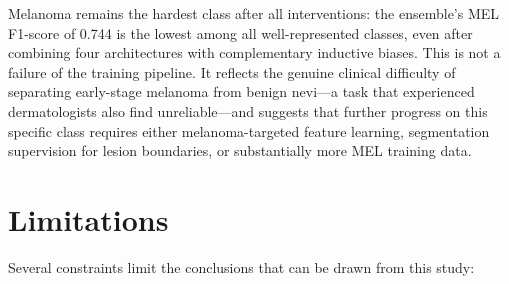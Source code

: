 Melanoma remains the hardest class after all interventions: the ensemble's MEL F1-score of 0.744 is the lowest among all well-represented classes, even after combining four architectures with complementary inductive biases. This is not a failure of the training pipeline. It reflects the genuine clinical difficulty of separating early-stage melanoma from benign nevi---a task that experienced dermatologists also find unreliable---and suggests that further progress on this specific class requires either melanoma-targeted feature learning, segmentation supervision for lesion boundaries, or substantially more MEL training data.

\section{Limitations}

Several constraints limit the conclusions that can be drawn from this study:

